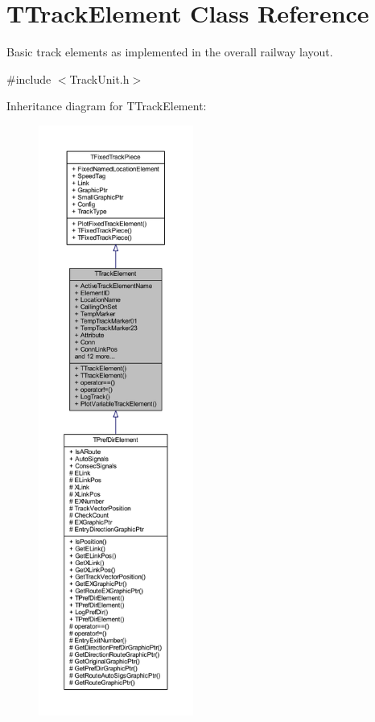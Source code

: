 \hypertarget{class_t_track_element}{}\section{T\+Track\+Element Class Reference}
\label{class_t_track_element}


Basic track elements as implemented in the overall railway layout.  




{\ttfamily \#include $<$Track\+Unit.\+h$>$}



Inheritance diagram for T\+Track\+Element\+:\nopagebreak
\begin{figure}[H]
\begin{center}
\leavevmode
\includegraphics[height=550pt]{class_t_track_element__inherit__graph}
\end{center}
\end{figure}


